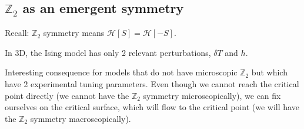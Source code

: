 \documentclass[a4paper]{book}
\theoremstyle{definition}
\theoremstyle{remark}
\begin{document}
\subsection{$\mathbb{Z}_2$ as an emergent symmetry}

Recall: $\mathbb{Z}_2$ symmetry means $\mathcal{H}[S] = \mathcal{H}[-S]$. \par \medskip 

In 3D, the Ising model has only 2 relevant perturbations, $\delta T$ and $h$. \par \medskip 

Interesting consequence for models that do not have microscopic $\mathbb{Z}_2$ but which have 2 experimental tuning parameters. Even though we cannot reach the critical point directly (we cannot have the $\mathbb{Z}_2$ symmetry microscopically), we can fix ourselves on the critical surface, which will flow to the critical point (we will have the $\mathbb{Z}_2$ symmetry macroscopically). 
\end{document}
